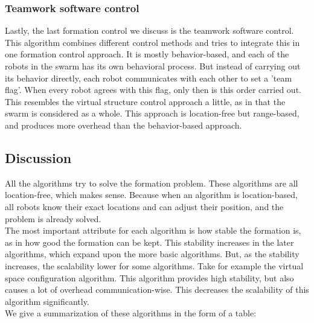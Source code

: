 \subsubsection{Teamwork software control}
Lastly, the last formation control we discuss is the teamwork software control. \cite{kaminka2013use}
This algorithm combines different control methods and tries to integrate this in one formation control approach.
It is mostly behavior-based, and each of the robots in the swarm has its own behavioral process. 
But instead of carrying out its behavior directly, each robot communicates with each other to set a 'team flag'. 
When every robot agrees with this flag, only then is this order carried out. 
This resembles the virtual structure control approach a little, as in that the swarm is considered as a whole. 
This approach is location-free but range-based, and produces more overhead than the behavior-based approach.

\subsection{Discussion}
All the algorithms try to solve the formation problem. 
These algorithms are all location-free, which makes sense.  
Because when an algorithm is location-based, all robots know their exact locations and can adjust their position, and the problem is already solved. \\
The most important attribute for each algorithm is how stable the formation is, as in how good the formation can be kept. 
This stability increases in the later algorithms, which expand upon the more basic algorithms. 
But, as the stability increases, the scalability lower for some algorithms. 
Take for example the virtual space configuration algorithm. 
This algorithm provides high stability, but also causes a lot of overhead communication-wise. 
This decreases the scalability of this algorithm significantly.\\

We give a summarization of these algorithms in the form of a table:

